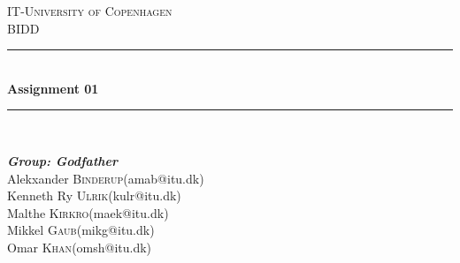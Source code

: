 \begin{titlepage}
\newcommand{\HRule}{\rule{\linewidth}{0.5mm}}

\center

\textsc{\Large IT-University of Copenhagen}\\[1.5cm]
\textsc{\large BIDD}
\HRule\\[0.4cm]
{\huge \bfseries Assignment 01}\\[0.4cm]
\HRule\\[1.5cm]

\begin{minipage}{0.7\textwidth}
\begin{flushleft} \Large
\emph{\textbf{Group: Godfather}}\\
\large
Alekxander \textsc{Binderup}(amab@itu.dk)\\
Kenneth Ry \textsc{Ulrik}(kulr@itu.dk)\\
Malthe \textsc{Kirkro}(maek@itu.dk)\\
Mikkel \textsc{Gaub}(mikg@itu.dk)\\
Omar \textsc{Khan}(omsh@itu.dk)\\
\end{flushleft}
\end{minipage}


\end{titlepage}